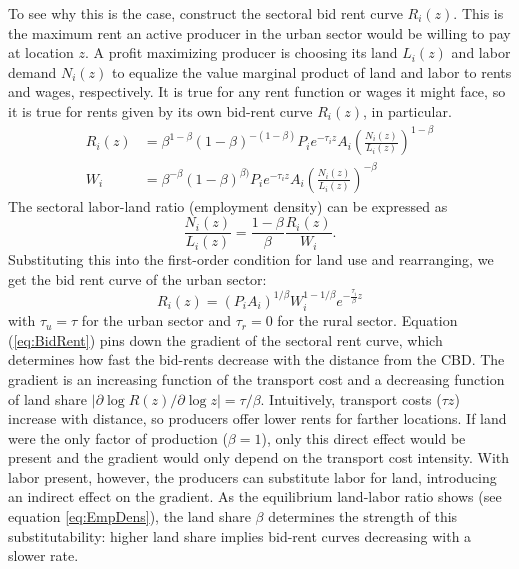 \documentclass[12pt]{article}
\begin{document}
To see why this is the case, construct the sectoral bid rent curve $R_i(z)$. This is the maximum rent an active producer in the urban sector would be willing to pay at location $z$. %
A profit maximizing producer is choosing its land $L_i(z)$ and labor demand $N_i(z)$ to equalize the value marginal product of land and labor to rents and wages, respectively. It is true for any rent function or wages it might face, so it is true for rents given by its own bid-rent curve $R_i(z)$, in particular.
\begin{align}
R_i(z) &=\beta^{1-\beta}(1-\beta)^{-(1-\beta)} P_ie^{-\tau_i z}A_i \left(\frac{N_i(z)}{L_i(z)}\right)^{1-\beta}\\
W_i &=\beta^{-\beta}(1-\beta)^{\beta)} P_ie^{-\tau_i z}A_i \left(\frac{N_i(z)}{L_i(z)}\right)^{-\beta}
\end{align}
The sectoral labor-land ratio (employment density) can be expressed as
\begin{equation}
\label{eq:EmpDens}
\frac{N_i(z)}{L_i(z)} = \frac{1-\beta}{\beta}\frac{R_i(z)}{W_i}.
\end{equation}
Substituting this into the first-order condition for land use and rearranging, we get the bid rent curve of the urban sector:
\begin{equation}
\label{eq:BidRent}
R_i(z) =(P_iA_i)^{1/\beta} W_i^{1-1/\beta} e^{-\frac{\tau_i}{\beta} z}
\end{equation}
with $\tau_u=\tau$ for the urban sector and $\tau_r=0$ for the rural sector. Equation (\ref{eq:BidRent}) pins down the gradient of the sectoral rent curve, which determines how fast the bid-rents decrease with the distance from the CBD. The gradient is an increasing function of the transport cost and a decreasing function of land share $|\partial\log R(z)/\partial \log z|=\tau/\beta$. Intuitively, transport costs ($\tau z$) increase with distance, so producers offer lower rents for farther locations. If land were the only factor of production ($\beta=1$), only this direct effect would be present and the gradient would only depend on the transport cost intensity. With labor present, however, the producers can substitute labor for land, introducing an indirect effect on the gradient. As the equilibrium land-labor ratio shows (see equation \ref{eq:EmpDens}), the land share $\beta$ determines the strength of this substitutability: higher land share implies bid-rent curves decreasing with a slower rate.
\end{document}
